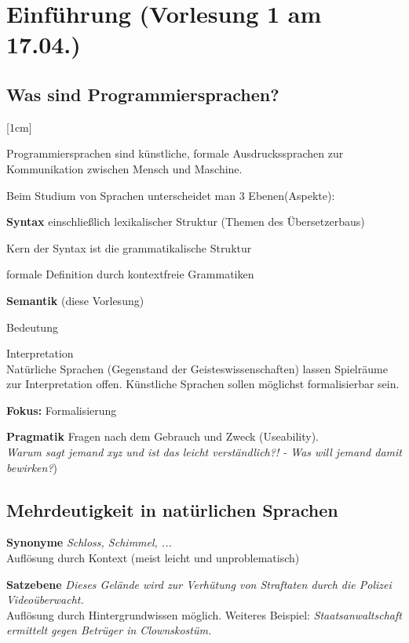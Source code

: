 \section{Einführung \small (Vorlesung 1 am 17.04.)}
\subsection{Was sind Programmiersprachen?}
[1cm]
\begin{defn}[Programmiersprachen]
Programmiersprachen sind künstliche, formale Ausdruckssprachen zur Kommunikation zwischen Mensch und Maschine.
\end{defn}
Beim Studium von Sprachen unterscheidet man 3 Ebenen(Aspekte):
\begin{compactitem}
	\item [\textbf{Syntax}] einschließlich lexikalischer Struktur (Themen des Übersetzerbaus)
	\begin{compactitem}
		\item Kern der Syntax ist die grammatikalische Struktur
		\item formale Definition durch kontextfreie Grammatiken
	\end{compactitem}
	\item [\textbf{Semantik}] (diese Vorlesung)
	\begin{compactitem}
		\item Bedeutung
		\item Interpretation \\
		Natürliche Sprachen (Gegenstand der Geisteswissenschaften) lassen Spielräume zur Interpretation offen. Künstliche Sprachen sollen möglichst formalisierbar sein.
		\item [\textbf{Fokus:}] Formalisierung
	\end{compactitem}
	\item [\textbf{Pragmatik}] Fragen nach dem Gebrauch und Zweck (Useability).\\ 
	\emph{Warum sagt jemand xyz und ist das leicht verständlich?! - Was will jemand damit bewirken?})
\end{compactitem}
\subsection{Mehrdeutigkeit in natürlichen Sprachen}
\begin{compactitem}
	\item [\textbf{Synonyme}] \emph{Schloss, Schimmel, ...}\\
	Auflösung durch Kontext (meist leicht und unproblematisch)
	\item [\textbf{Satzebene}] \emph{Dieses Gelände wird zur Verhütung von Straftaten durch die Polizei Videoüberwacht.}\\
	Auflösung durch Hintergrundwissen möglich. Weiteres Beispiel: \emph{Staatsanwaltschaft ermittelt gegen Betrüger in Clownskostüm.}
\end{compactitem}

